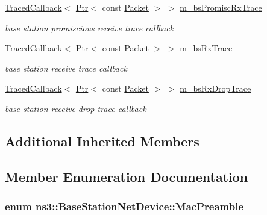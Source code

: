 \begin{DoxyCompactItemize}
\hyperlink{classns3_1_1TracedCallback}{Traced\+Callback}$<$ \hyperlink{classns3_1_1Ptr}{Ptr}$<$ const \hyperlink{classns3_1_1Packet}{Packet} $>$ $>$ \hyperlink{classns3_1_1BaseStationNetDevice_af74f0fa68c65b8e0b1e19e67a9c19cea}{m\+\_\+bs\+Promisc\+Rx\+Trace}
\begin{DoxyCompactList}\small\item\em base station promiscious receive trace callback \end{DoxyCompactList}\item 
\hyperlink{classns3_1_1TracedCallback}{Traced\+Callback}$<$ \hyperlink{classns3_1_1Ptr}{Ptr}$<$ const \hyperlink{classns3_1_1Packet}{Packet} $>$ $>$ \hyperlink{classns3_1_1BaseStationNetDevice_aff889426b2009f26312b689ac4015a8d}{m\+\_\+bs\+Rx\+Trace}
\begin{DoxyCompactList}\small\item\em base station receive trace callback \end{DoxyCompactList}\item 
\hyperlink{classns3_1_1TracedCallback}{Traced\+Callback}$<$ \hyperlink{classns3_1_1Ptr}{Ptr}$<$ const \hyperlink{classns3_1_1Packet}{Packet} $>$ $>$ \hyperlink{classns3_1_1BaseStationNetDevice_a4835b0ad2180229900fc09ae5207bd8f}{m\+\_\+bs\+Rx\+Drop\+Trace}
\begin{DoxyCompactList}\small\item\em base station receive drop trace callback \end{DoxyCompactList}\end{DoxyCompactItemize}
\subsection*{Additional Inherited Members}


\subsection{Member Enumeration Documentation}
\subsubsection[{\texorpdfstring{Mac\+Preamble}{MacPreamble}}]{\setlength{\rightskip}{0pt plus 5cm}enum {\bf ns3\+::\+Base\+Station\+Net\+Device\+::\+Mac\+Preamble}}\hypertarget{classns3_1_1BaseStationNetDevice_a1043912af2173c4026f8d3f5dc87df3b}{}\label{classns3_1_1BaseStationNetDevice_a1043912af2173c4026f8d3f5dc87df3b}


